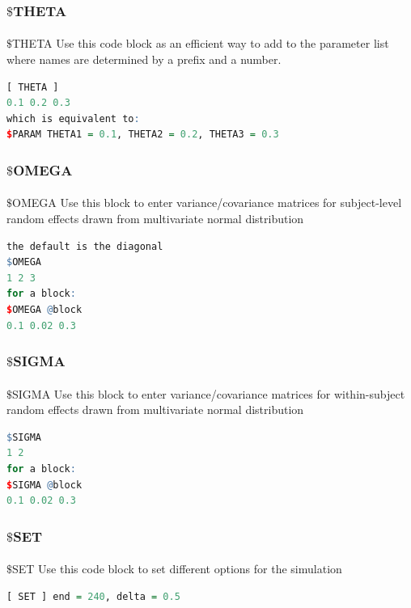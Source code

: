 \documentclass[
	11pt, %
]{beamer}
\begin{document}


\begin{frame}[fragile]
	\frametitle{$\$$THETA}
	\framesubtitle{} %
	\begin{block}{$\$$THETA}
	\small
Use this code block as an efficient way to add to the parameter list where names are determined by a prefix and a number. 
\begin{lstlisting}[language=R]
[ THETA ]
0.1 0.2 0.3
which is equivalent to:
$PARAM THETA1 = 0.1, THETA2 = 0.2, THETA3 = 0.3
\end{lstlisting}
	\end{block}

\end{frame}



\begin{frame}[fragile]
	\frametitle{$\$$OMEGA}
	\framesubtitle{} %
	\begin{block}{$\$$OMEGA}
	\small
Use this block to enter variance/covariance matrices for subject-level random effects drawn from multivariate normal distribution
\begin{lstlisting}[language=R]
the default is the diagonal
$OMEGA 
1 2 3
for a block:
$OMEGA @block 
0.1 0.02 0.3
\end{lstlisting}
	\end{block}

\end{frame}



\begin{frame}[fragile]
	\frametitle{$\$$SIGMA}
	\framesubtitle{} %
	\begin{block}{$\$$SIGMA}
	\small
Use this block to enter variance/covariance matrices for within-subject random effects drawn from multivariate normal distribution
\begin{lstlisting}[language=R]
$SIGMA
1 2 
for a block:
$SIGMA @block 
0.1 0.02 0.3
\end{lstlisting}
	\end{block}

\end{frame}


\begin{frame}[fragile]
	\frametitle{$\$$SET}
	\framesubtitle{} %
	\begin{block}{$\$$SET}
	\small
Use this code block to set different options for the simulation
\begin{lstlisting}[language=R]
[ SET ] end = 240, delta = 0.5
\end{lstlisting}
	\end{block}

\end{frame}
\end{document}
